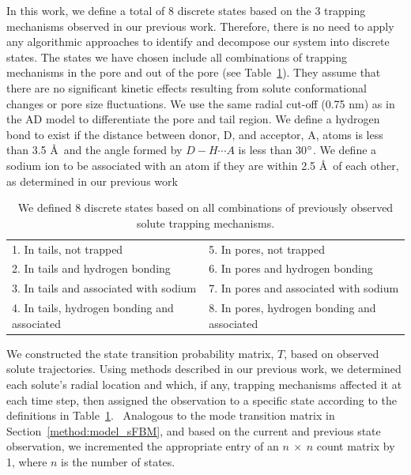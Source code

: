 \documentclass[12pt]{article}
\begin{document}
  In this work, we define a total of 8 discrete states based on the 3 trapping
  mechanisms observed in our previous work. Therefore, there is no need to 
  apply any algorithmic approaches to identify and decompose our system into 
  discrete states. The states we have chosen include all combinations of trapping
  mechanisms in the pore and out of the pore (see Table~\ref{table:states}). They
  assume that there are no significant kinetic effects resulting from solute 
  conformational changes or pore size fluctuations. We use the same radial cut-off
  (0.75 nm) as in the AD model to differentiate the pore and tail region.  We define 
  a hydrogen bond to exist if the distance between donor, D, and acceptor, A, 
  atoms is less than 3.5 \AA~and the angle formed by $D-H \cdots A$ is less than
  30$\degree$. We define a sodium ion to be associated with an atom if they are 
  within 2.5 \AA~of each other, as determined in our previous work~\cite{coscia_chemically_2019}
  
  \begin{table}[!htb]
	  \centering
	  \begin{tabular}{|l|l|}
	  \hline
	  1. In tails, not trapped                     & 5. In pores, not trapped                     \\
	  2. In tails and hydrogen bonding             & 6. In pores and hydrogen bonding             \\
	  3. In tails and associated with sodium       & 7. In pores and associated with sodium       \\
	  4. In tails, hydrogen bonding and associated & 8. In pores, hydrogen bonding and associated \\
	  \hline
	  \end{tabular}
	  \caption{We defined 8 discrete states based on all combinations of previously observed solute
	  trapping mechanisms.}\label{table:states}  
  \end{table}
  
  We constructed the state transition probability matrix, $T$, based on observed solute trajectories.
  Using methods described in our previous work, we determined each solute's radial location 
  and which, if any, trapping mechanisms affected it at each time step, then assigned the 
  observation to a specific state according to the definitions in Table~\ref{table:states}.~\cite{coscia_chemically_2019}
  Analogous to the mode transition matrix in Section~\ref{method:model_sFBM}, and based on
  the current and previous state observation, we incremented the appropriate entry of an
  $n~\times~n$ count matrix by 1, where $n$ is the number of states.
  
\end{document}
